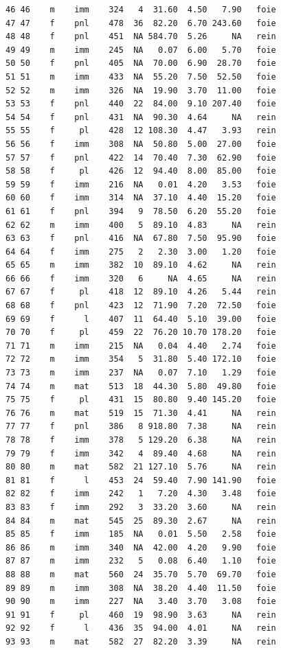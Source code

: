 \documentclass[
  a4paper,
  DIV=11,
  numbers=noendperiod,
  oneside]{scrreprt}
\begin{document}
\begin{verbatim}
46 46    m    imm    324   4  31.60  4.50   7.90   foie
47 47    f    pnl    478  36  82.20  6.70 243.60   foie
48 48    f    pnl    451  NA 584.70  5.26     NA   rein
49 49    m    imm    245  NA   0.07  6.00   5.70   foie
50 50    f    pnl    405  NA  70.00  6.90  28.70   foie
51 51    m    imm    433  NA  55.20  7.50  52.50   foie
52 52    m    imm    326  NA  19.90  3.70  11.00   foie
53 53    f    pnl    440  22  84.00  9.10 207.40   foie
54 54    f    pnl    431  NA  90.30  4.64     NA   rein
55 55    f     pl    428  12 108.30  4.47   3.93   rein
56 56    f    imm    308  NA  50.80  5.00  27.00   foie
57 57    f    pnl    422  14  70.40  7.30  62.90   foie
58 58    f     pl    426  12  94.40  8.00  85.00   foie
59 59    f    imm    216  NA   0.01  4.20   3.53   foie
60 60    f    imm    314  NA  37.10  4.40  15.20   foie
61 61    f    pnl    394   9  78.50  6.20  55.20   foie
62 62    m    imm    400   5  89.10  4.83     NA   rein
63 63    f    pnl    416  NA  67.80  7.50  95.90   foie
64 64    f    imm    275   2   2.30  3.00   1.20   foie
65 65    m    imm    382  10  89.10  4.62     NA   rein
66 66    f    imm    320   6     NA  4.65     NA   rein
67 67    f     pl    418  12  89.10  4.26   5.44   rein
68 68    f    pnl    423  12  71.90  7.20  72.50   foie
69 69    f      l    407  11  64.40  5.10  39.00   foie
70 70    f     pl    459  22  76.20 10.70 178.20   foie
71 71    m    imm    215  NA   0.04  4.40   2.74   foie
72 72    m    imm    354   5  31.80  5.40 172.10   foie
73 73    m    imm    237  NA   0.07  7.10   1.29   foie
74 74    m    mat    513  18  44.30  5.80  49.80   foie
75 75    f     pl    431  15  80.80  9.40 145.20   foie
76 76    m    mat    519  15  71.30  4.41     NA   rein
77 77    f    pnl    386   8 918.80  7.38     NA   rein
78 78    f    imm    378   5 129.20  6.38     NA   rein
79 79    f    imm    342   4  89.40  4.68     NA   rein
80 80    m    mat    582  21 127.10  5.76     NA   rein
81 81    f      l    453  24  59.40  7.90 141.90   foie
82 82    f    imm    242   1   7.20  4.30   3.48   foie
83 83    f    imm    292   3  33.20  3.60     NA   rein
84 84    m    mat    545  25  89.30  2.67     NA   rein
85 85    f    imm    185  NA   0.01  5.50   2.58   foie
86 86    m    imm    340  NA  42.00  4.20   9.90   foie
87 87    m    imm    232   5   0.08  6.40   1.10   foie
88 88    m    mat    560  24  35.70  5.70  69.70   foie
89 89    m    imm    308  NA  38.20  4.40  11.50   foie
90 90    m    imm    227  NA   3.40  3.70   3.08   foie
91 91    f     pl    460  19  98.90  3.63     NA   rein
92 92    f      l    436  35  94.00  4.01     NA   rein
93 93    m    mat    582  27  82.20  3.39     NA   rein
\end{verbatim}
\end{document}

